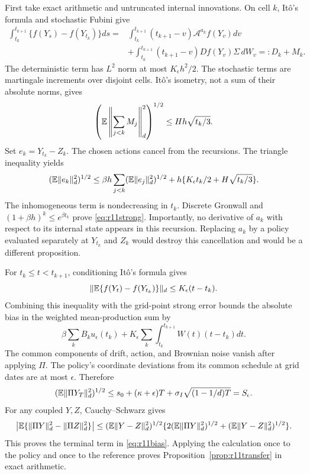 First take exact arithmetic and untruncated internal innovations. On cell $k$, It\^o's formula and stochastic Fubini give
\begin{align*}
 \int_{t_k}^{t_{k+1}}\{f(Y_s)-f(Y_{t_k})\}ds
 ={}&\int_{t_k}^{t_{k+1}}(t_{k+1}-v)\mathcal A^{a_k} f(Y_v)dv\\
 &+\int_{t_k}^{t_{k+1}}(t_{k+1}-v)D f(Y_v)\Sigma\,dW_v
 =:D_k+M_k.
\end{align*}
The deterministic term has $L^2$ norm at most $K_\epsilon h^2/2$. The stochastic terms are martingale increments over disjoint cells. It\^o's isometry, not a sum of their absolute norms, gives
\[
 \left(\mathbb E\left\|\sum_{j<k}M_j\right\|_d^2\right)^{1/2}
 \leq Hh\sqrt{t_k/3}.
\]
Set $e_k=Y_{t_k}-Z_k$. The chosen actions cancel from the recursions. The triangle inequality yields
\[
 (\mathbb E\|e_k\|_d^2)^{1/2}
 \leq\beta h\sum_{j<k}(\mathbb E\|e_j\|_d^2)^{1/2}
       +h\{K_\epsilon t_k/2+H\sqrt{t_k/3}\}.
\]
The inhomogeneous term is nondecreasing in $t_k$. Discrete Gronwall and $(1+\beta h)^k\leq e^{\beta t_k}$ prove \eqref{eq:r11strong}. Importantly, no derivative of $a_k$ with respect to its internal state appears in this recursion. Replacing $a_k$ by a policy evaluated separately at $Y_{t_k}$ and $Z_k$ would destroy this cancellation and would be a different proposition.

For $t_k\leq t<t_{k+1}$, conditioning It\^o's formula gives
\[
 \|\mathbb E\{f(Y_t)-f(Y_{t_k})\}\|_d\leq K_\epsilon(t-t_k).
\]
Combining this inequality with the grid-point strong error bounds the absolute bias in the weighted mean-production sum by
\[
 \beta\sum_k B_k u_\epsilon(t_k)+
 K_\epsilon\sum_k\int_{t_k}^{t_{k+1}}W(t)(t-t_k)dt.
\]
The common components of drift, action, and Brownian noise vanish after applying $\Pi$. The policy's coordinate deviations from its common schedule at grid dates are at most $\epsilon$. Therefore
\[
 (\mathbb E\|\Pi Y_T\|_d^2)^{1/2}
 \leq s_0+(\kappa+\epsilon)T+\sigma_I\sqrt{(1-1/d)T}=S_\epsilon.
\]
For any coupled $Y,Z$, Cauchy--Schwarz gives
\[
 \left|\mathbb E\{\|\Pi Y\|_d^2-\|\Pi Z\|_d^2\}\right|
 \leq (\mathbb E\|Y-Z\|_d^2)^{1/2}
       \{2(\mathbb E\|\Pi Y\|_d^2)^{1/2}+(\mathbb E\|Y-Z\|_d^2)^{1/2}\}.
\]
This proves the terminal term in \eqref{eq:r11bias}. Applying the calculation once to the policy and once to the reference proves Proposition~\ref{prop:r11transfer} in exact arithmetic.

